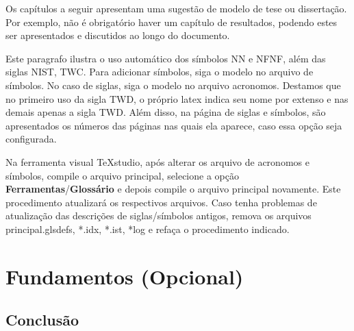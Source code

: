 Os capítulos a seguir apresentam uma sugestão de modelo de tese ou dissertação. Por exemplo, não é obrigatório haver um capítulo de resultados, podendo estes ser apresentados e discutidos ao longo do documento.

Este paragrafo ilustra o uso automático dos símbolos \gls{NN} e \gls{NFNF}, além das siglas \gls{NIST}, \gls{TWC}. Para adicionar símbolos, siga o modelo no arquivo de símbolos. No caso de siglas, siga o modelo no arquivo acronomos. Destamos que no primeiro uso da sigla \gls{TWD}, o próprio latex indica seu nome por extenso e nas demais apenas a sigla \gls{TWD}. Além disso, na página de siglas e símbolos, são apresentados os números das páginas nas quais ela aparece, caso essa opção seja configurada.

Na ferramenta visual TeXstudio, após alterar os arquivo de acronomos e símbolos, compile o arquivo principal, selecione a opção \textbf{Ferramentas}/\textbf{Glossário} e depois compile o arquivo principal novamente. Este procedimento atualizará os respectivos arquivos. Caso tenha problemas de atualização das descrições de siglas/símbolos antigos, remova os arquivos principal.glsdefs, *.idx, *.ist, *log e refaça o procedimento indicado.

	 
\nolinenumbers
\part{Fundamentos (Opcional)}
\linenumbers

\resetlinenumber


\resetlinenumber


\resetlinenumber


\resetlinenumber
\chapter{Conclus\~{a}o}

\lipsum[31-33]


\nolinenumbers  %


\postextual

